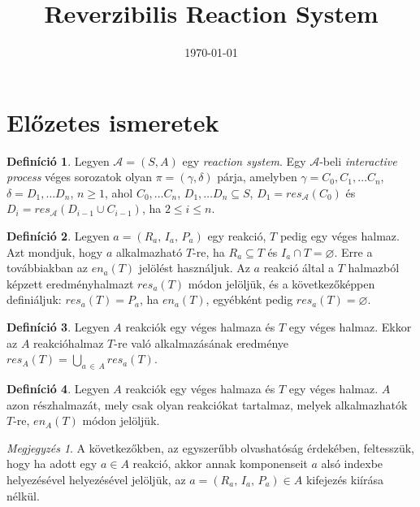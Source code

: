 \documentclass[12pt]{article}
\title{Reverzibilis Reaction System}
\date{\today}
\theoremstyle{definition}
\newtheorem*{definition*}{Definíció}
\theoremstyle{remark}
\newtheorem*{remark*}{Megjegyzés}
\theoremstyle{plain}
\theoremstyle{plain}
\let\emptyset\varnothing
\newcommand{\en}{\textit{en}}
\newcommand{\res}{\textit{res}}
\newcommand{\reaction}[3]{
    (#1, \, #2, \, #3)
}
\begin{document}
    \maketitle

    \section*{Előzetes ismeretek}

    \begin{definition*}
        Legyen $\mathscr{A} = (S, A)$ egy \textit{reaction system}. Egy $\mathscr{A}$-beli \textit{interactive process} véges sorozatok olyan $\pi = (\gamma, \delta)$ párja, amelyben $\gamma = C_{0}, C_{1}, \ldots C_{n}$, $\delta = D_{1}, \ldots D_{n}$, $n \geq 1$, ahol $C_{0}, \ldots C_{n}$, $D_{1}, \ldots D_{n} \subseteq S$, $D_{1} = \textit{res}_{\mathscr{A}}(C_{0})$ és $D_{i} = \textit{res}_{\mathscr{A}}(D_{i - 1} \cup C_{i - 1})$, ha $2 \leq i \leq n$.
    \end{definition*}

    \begin{definition*}
        Legyen $a = \reaction{R_{a}}{I_{a}}{P_{a}}$ egy reakció, $T$ pedig egy véges halmaz. Azt mondjuk, hogy $a$ alkalmazható $T$-re, ha $R_{a} \subseteq T$ és $I_{a} \cap T = \emptyset$. Erre a továbbiakban az $\en_{a}(T)$ jelölést használjuk. Az $a$ reakció által a $T$ halmazból képzett eredményhalmazt $\res_{a}(T)$ módon jelöljük, és a következőképpen definiáljuk: $\res_{a}(T) = P_{a}$, ha $\en_{a}(T)$, egyébként pedig $\res_{a}(T) = \emptyset$.
    \end{definition*}

    \begin{definition*}
        Legyen $A$ reakciók egy véges halmaza és $T$ egy véges halmaz. Ekkor az $A$ reakcióhalmaz $T$-re való alkalmazásának eredménye $\res_{A}(T) = \bigcup_{a \,\in\, A}\res_{a}(T)$.
    \end{definition*}

    \begin{definition*}
        Legyen $A$ reakciók egy véges halmaza és $T$ egy véges halmaz. $A$ azon részhalmazát, mely csak olyan reakciókat tartalmaz, melyek alkalmazhatók $T$-re, $\en_{A}(T)$ módon jelöljük.
    \end{definition*}
    
    \begin{remark*}
        A következőkben, az egyszerűbb olvashatóság érdekében, feltesszük, hogy ha adott egy $a \in A$ reakció, akkor annak komponenseit $a$ alsó indexbe helyezésével helyezésével jelöljük, az $a = \reaction{R_{a}}{I_{a}}{P_{a}} \in A$ kifejezés kiírása nélkül.
    \end{remark*}
\end{document}
